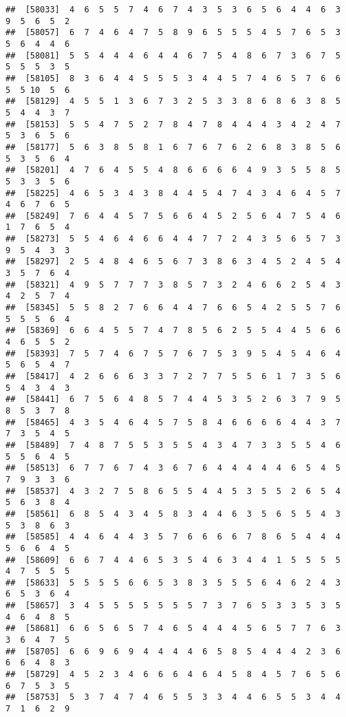 \documentclass[
]{book}
\begin{document}
\begin{verbatim}
##  [58033]  4  6  5  5  7  4  6  7  4  3  5  3  6  5  6  4  4  6  3  9  5  6  5  2
##  [58057]  6  7  4  6  4  7  5  8  9  6  5  5  5  4  5  7  6  5  3  5  6  4  4  6
##  [58081]  5  5  4  4  4  6  4  4  6  7  5  4  8  6  7  3  6  7  5  5  5  5  3  5
##  [58105]  8  3  6  4  4  5  5  5  3  4  4  5  7  4  6  5  7  6  6  5  5 10  5  6
##  [58129]  4  5  5  1  3  6  7  3  2  5  3  3  8  6  8  6  3  8  5  5  4  4  3  7
##  [58153]  5  5  4  7  5  2  7  8  4  7  8  4  4  4  3  4  2  4  7  5  3  6  5  6
##  [58177]  5  6  3  8  5  8  1  6  7  6  7  6  2  6  8  3  8  5  6  5  3  5  6  4
##  [58201]  4  7  6  4  5  5  4  8  6  6  6  6  4  9  3  5  5  8  5  5  3  3  5  6
##  [58225]  4  6  5  3  4  3  8  4  4  5  4  7  4  3  4  6  4  5  7  4  6  7  6  5
##  [58249]  7  6  4  4  5  7  5  6  6  4  5  2  5  6  4  7  5  4  6  1  7  6  5  4
##  [58273]  5  5  4  6  4  6  6  4  4  7  7  2  4  3  5  6  5  7  3  9  5  4  3  3
##  [58297]  2  5  4  8  4  6  5  6  7  3  8  6  3  4  5  2  4  5  4  3  5  7  6  4
##  [58321]  4  9  5  7  7  7  3  8  5  7  3  2  4  6  6  2  5  4  3  4  2  5  7  4
##  [58345]  5  5  8  2  7  6  6  4  4  7  6  6  5  4  2  5  5  7  6  5  5  5  6  4
##  [58369]  6  6  4  5  5  7  4  7  8  5  6  2  5  5  4  4  5  6  6  4  6  5  5  2
##  [58393]  7  5  7  4  6  7  5  7  6  7  5  3  9  5  4  5  4  6  4  5  6  5  4  7
##  [58417]  4  2  6  6  6  3  3  7  2  7  7  5  5  6  1  7  3  5  6  5  4  3  4  3
##  [58441]  6  7  5  6  4  8  5  7  4  4  5  3  5  2  6  3  7  9  5  8  5  3  7  8
##  [58465]  4  3  5  4  6  4  5  7  5  8  4  6  6  6  6  4  4  3  7  7  3  5  4  5
##  [58489]  7  4  8  7  5  5  3  5  5  4  3  4  7  3  3  5  5  4  6  5  5  6  4  5
##  [58513]  6  7  7  6  7  4  3  6  7  6  4  4  4  4  4  6  5  4  5  7  9  3  3  6
##  [58537]  4  3  2  7  5  8  6  5  5  4  4  5  3  5  5  2  6  5  4  5  6  3  8  4
##  [58561]  6  8  5  4  3  4  5  8  3  4  4  6  3  5  6  5  5  4  3  5  3  8  6  3
##  [58585]  4  4  6  4  4  3  5  7  6  6  6  6  7  8  6  5  4  4  4  5  6  6  4  5
##  [58609]  6  6  7  4  4  6  5  3  5  4  6  3  4  4  1  5  5  5  5  4  7  5  5  5
##  [58633]  5  5  5  5  6  6  5  3  8  3  5  5  5  6  4  6  2  4  3  6  5  3  6  4
##  [58657]  3  4  5  5  5  5  5  5  5  7  3  7  6  5  3  3  5  3  5  4  6  4  8  5
##  [58681]  6  6  5  6  5  7  4  6  5  4  4  4  5  6  5  7  7  6  3  3  6  4  7  5
##  [58705]  6  6  9  6  9  4  4  4  4  6  5  8  5  4  4  4  2  3  6  6  6  4  8  3
##  [58729]  4  5  2  3  4  6  6  6  4  6  4  5  8  4  5  7  6  5  6  6  7  5  3  5
##  [58753]  5  3  7  4  7  4  6  5  5  3  3  4  4  6  5  5  3  4  4  7  1  6  2  9

\end{verbatim}
\end{document}
